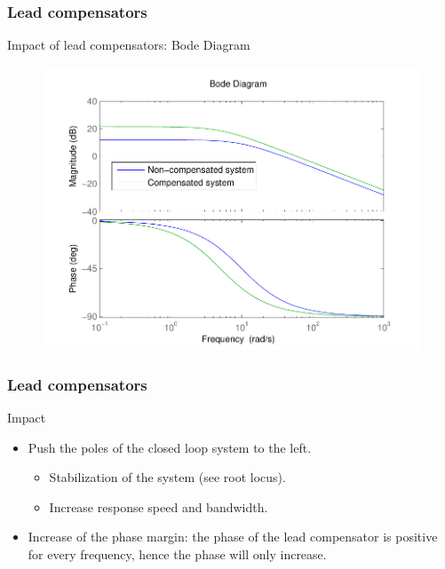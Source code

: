 \begin{frame}
	\frametitle{Lead compensators}
	\begin{block}{Impact of lead compensators: Bode Diagram}
		\begin{figure}
			\centering
			\includegraphics[width=0.7
			\linewidth]{impactleadmuchbetter}
		\end{figure}
	\end{block}
\end{frame}

\begin{frame}
\frametitle{Lead compensators}
\begin{block}{Impact}
	\begin{itemize}
	\item Push the poles of the closed loop system to the left.
	\begin{itemize}
	\item Stabilization of the system (see root locus).
	\item Increase response speed and bandwidth.
	\end{itemize}
	\item Increase of the phase margin: the phase of the lead compensator is positive for every frequency, hence the phase will only increase.
	\end{itemize}
\end{block}
\end{frame}

